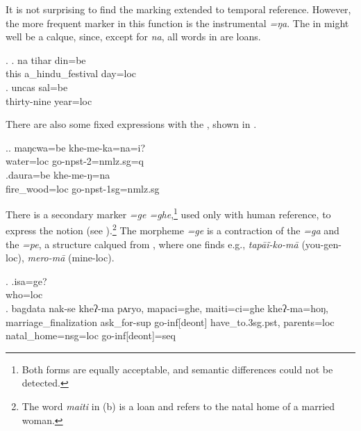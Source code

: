 It is not surprising to find the  marking extended to temporal reference. However, the more frequent marker in this function is the instrumental \emph{=ŋa}. The  in \Next might well be a  calque, since, except for \emph{na}, all words in \Next are  loans. 

\ex. \ag. na tihar din=be\\
		this a\_hindu\_festival day{\sc =loc}	\\
	 
 	\bg. uncas sal=be\\
	thirty-nine year{\sc =loc}		\\
	 

	There are also some fixed expressions with the , shown in \Next.
	
	\ex.\ag. maŋcwa=be  khe-me-ka=na=i?\\
	water{\sc =loc} go{\sc -npst-2=nmlz.sg=q}\\
	 	
	\bg.daura=be khe-me-ŋ=na\\
	fire\_wood{\sc =loc} go{\sc -npst-1sg=nmlz.sg}\\
	
There is a secondary  marker \emph{=ge \ti =ghe},\footnote{Both forms are equally acceptable, and semantic differences could not be detected.} used only with human reference, to express the notion  (see \Next).\footnote{The word \emph{maiti} in (b) is a  loan and refers to the natal home of a married woman.} The morpheme \emph{=ge} is a contraction of the  \emph{=ga} and the  \emph{=pe}, a structure calqued from , where one finds e.g.,  \emph{tapāĩ-ko-mā}  (you-{\sc gen-loc}), \emph{mero-mā}  (mine-{\sc loc}). 

\ex. \ag.isa=ge?\\
		who{\sc =loc}\\
 	\bg. bagdata                  nak-se            kheʔ-ma           pʌryo,  mapaci=ghe,                maiti=ci=ghe             kheʔ-ma=hoŋ,\\
		marriage\_finalization ask\_for{\sc -sup} go{\sc -inf[deont]} have\_to{\sc .3sg.pst},  parents{\sc =loc} natal\_home{\sc =nsg=loc} go{\sc -inf[deont]=seq} \\
	 
	
